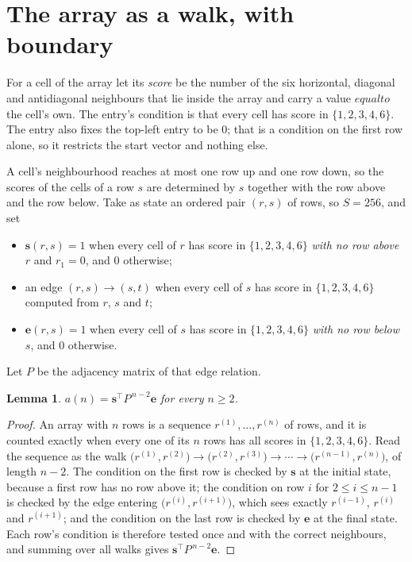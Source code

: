 \documentclass[11pt,a4paper]{article}
\theoremstyle{plain}
\newtheorem{lemma}[theorem]{Lemma}
\theoremstyle{definition}
\begin{document}
\section{The array as a walk, with boundary}

For a cell of the array let its \emph{score} be the number of the six horizontal, diagonal and antidiagonal neighbours that lie inside
the array and carry a value $equal to$ the cell's own. The entry's condition is that every cell
has score in $\{1,2,3,4,6\}$. The entry also fixes the top-left entry to be $0$; that is a condition on the first row alone, so it restricts the start vector and nothing else.

A cell's neighbourhood reaches at most one row up and one row down, so the scores of the
cells of a row $s$ are determined by $s$ together with the row above and the row below.
Take as state an ordered pair $(r,s)$ of rows, so $S=256$, and set
\begin{itemize}
\item $\mathbf{s}(r,s)=1$ when every cell of $r$ has score in $\{1,2,3,4,6\}$ \emph{with no row
above $r$} and $r_1=0$, and $0$ otherwise;
\item an edge $(r,s)\to(s,t)$ when every cell of $s$ has score in $\{1,2,3,4,6\}$ computed from
$r$, $s$ and $t$;
\item $\mathbf{e}(r,s)=1$ when every cell of $s$ has score in $\{1,2,3,4,6\}$ \emph{with no row
below $s$}, and $0$ otherwise.
\end{itemize}
Let $P$ be the adjacency matrix of that edge relation.

\begin{lemma}\label{lem:walk}
$a(n)=\mathbf{s}^{\!\top}P^{\,n-2}\mathbf{e}$ for every $n\ge2$.
\end{lemma}

\begin{proof}
An array with $n$ rows is a sequence $r^{(1)},\dots,r^{(n)}$ of rows, and it is counted
exactly when every one of its $n$ rows has all scores in $\{1,2,3,4,6\}$. Read the sequence as the
walk $\bigl(r^{(1)},r^{(2)}\bigr)\to\bigl(r^{(2)},r^{(3)}\bigr)\to\cdots\to
\bigl(r^{(n-1)},r^{(n)}\bigr)$, of length $n-2$. The condition on the first row is
checked by $\mathbf{s}$ at the initial state, because a first row has no row above it; the
condition on row $i$ for $2\le i\le n-1$ is checked by the edge entering
$\bigl(r^{(i)},r^{(i+1)}\bigr)$, which sees exactly $r^{(i-1)}$, $r^{(i)}$ and
$r^{(i+1)}$; and the condition on the last row is checked by $\mathbf{e}$ at the final
state. Each row's condition is therefore tested once and with the correct neighbours, and
summing over all walks gives $\mathbf{s}^{\!\top}P^{\,n-2}\mathbf{e}$.
\end{proof}
\end{document}

